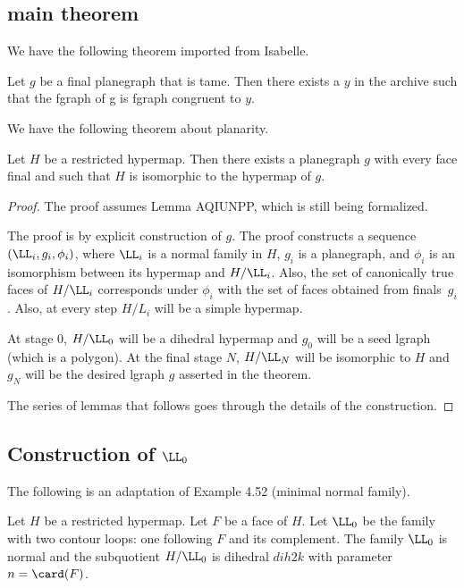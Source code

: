 
\subsection{main theorem}

We have the following theorem imported from Isabelle.

\begin{theorem}  Let $g$ be a final
planegraph that is tame.  Then there exists a $y$ in the archive such
that the fgraph of g is fgraph congruent to $y$.
\end{theorem}

We have the following theorem about planarity.

\begin{theorem} Let $H$ be a restricted hypermap.  Then
  there exists a planegraph $g$ with every
  face final and such that $H$ is isomorphic to the hypermap of $g$.
\end{theorem}

\begin{proof}  The proof assumes Lemma AQIUNPP,
which is still being formalized.

The proof is by explicit construction of $g$.  The proof constructs a
sequence $(\LL_i,g_i,\phi_i)$, where $\LL_i$ is a normal family in
$H$, $g_i$ is a planegraph, and $\phi_i$ is an isomorphism between its
hypermap and $H/\LL_i$.  Also, the set of canonically true faces of
$H/\LL_i$ corresponds under $\phi_i$ with the set of faces obtained
from finals~$g_i$.  Also, at every step $H/L_i$ will be a simple
hypermap.

At stage $0$, $H/\LL_0$ will be a dihedral hypermap and $g_0$ will be
a seed lgraph (which is a polygon).  At the final stage $N$, $H/\LL_N$
will be isomorphic to $H$ and $g_N$ will be the desired lgraph $g$
asserted in the theorem.

The series of lemmas that follows goes through the details
of the construction.
\end{proof}

\subsection{Construction of $\LL_0$}


The following is an adaptation of Example 4.52 (minimal normal family).

\begin{lemma} Let $H$ be a restricted hypermap.
  Let $F$ be a face of $H$.  Let $\LL_0$ be the family with two
  contour loops: one following $F$ and its complement.  The family
  $\LL_0$ is normal and the subquotient $H/\LL_0$ is dihedral 
  $dih2k$ with parameter $n=\card(F)$.
\end{lemma} 

